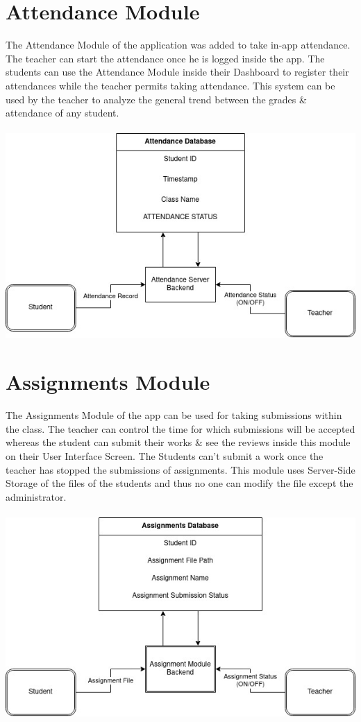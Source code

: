 \documentclass[10pt]{report}
\begin{document}
\section{Attendance Module}
The Attendance Module of the application was added to take in-app attendance. The teacher can start the attendance once he is logged inside the app. The students can use the Attendance Module inside their Dashboard to register their attendances while the teacher permits taking attendance. This system can be used by the teacher to analyze the general trend between the grades \& attendance of any student. \\ \\ 
\includegraphics[width=\textwidth]{attendance.jpeg}   \newpage
\section{Assignments Module}
The Assignments Module of the app can be used for taking submissions within the class. The teacher can control the time for which submissions will be accepted whereas the student can submit their works \& see the reviews inside this module on their User Interface Screen. The Students can't submit a work once the teacher has stopped the submissions of assignments. This module uses Server-Side Storage of the files of the students and thus no one can modify the file except the administrator. \\ \\ 
\includegraphics[width=\textwidth]{assignments.jpeg} 
\end{document}
